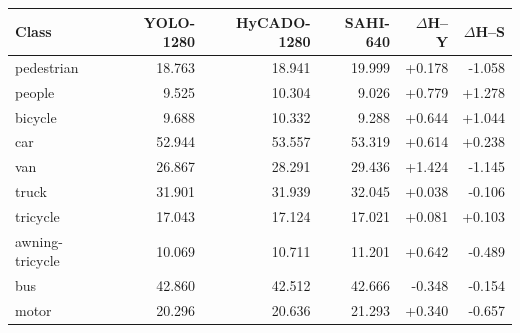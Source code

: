 \begin{tabular}{lrrrrr}
\toprule
Class & YOLO-1280 & HyCADO-1280 & SAHI-640 & $\Delta$H--Y & $\Delta$H--S\\
\midrule
pedestrian & 18.763 & 18.941 & 19.999 & +0.178 & -1.058\\
people & 9.525 & 10.304 & 9.026 & +0.779 & +1.278\\
bicycle & 9.688 & 10.332 & 9.288 & +0.644 & +1.044\\
car & 52.944 & 53.557 & 53.319 & +0.614 & +0.238\\
van & 26.867 & 28.291 & 29.436 & +1.424 & -1.145\\
truck & 31.901 & 31.939 & 32.045 & +0.038 & -0.106\\
tricycle & 17.043 & 17.124 & 17.021 & +0.081 & +0.103\\
awning-tricycle & 10.069 & 10.711 & 11.201 & +0.642 & -0.489\\
bus & 42.860 & 42.512 & 42.666 & -0.348 & -0.154\\
motor & 20.296 & 20.636 & 21.293 & +0.340 & -0.657\\
\bottomrule
\end{tabular}
